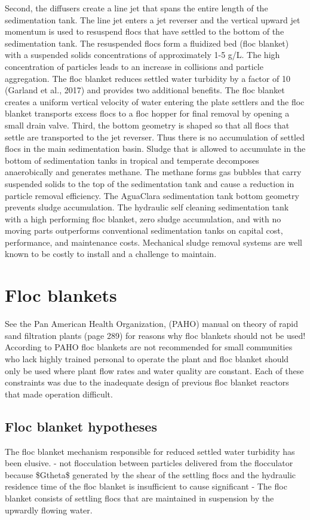 \documentclass[letterpaper,10pt,english]{sphinxmanual}
\begin{document}
Second, the diffusers create a line jet that spans the entire length of the sedimentation tank. The line jet enters a jet reverser and the vertical upward jet momentum is used to resuspend flocs that have settled to the bottom of the sedimentation tank. The resuspended flocs form a fluidized bed (floc blanket) with a suspended solids concentrations of approximately 1-5 g/L. The high concentration of particles leads to an increase in collisions and particle aggregation. The floc blanket reduces settled water turbidity by a factor of 10 (Garland et al., 2017) and provides two additional benefits. The floc blanket creates a uniform vertical velocity of water entering the plate settlers and the floc blanket transports excess flocs to a floc hopper for final removal by opening a small drain valve.
Third, the bottom geometry is shaped so that all flocs that settle are transported to the jet reverser. Thus there is no accumulation of settled flocs in the main sedimentation basin. Sludge that is allowed to accumulate in the bottom of sedimentation tanks in tropical and temperate decomposes anaerobically and generates methane. The methane forms gas bubbles that carry suspended solids to the top of the sedimentation tank and cause a reduction in particle removal efficiency.  The AguaClara sedimentation tank bottom geometry prevents sludge accumulation.
The hydraulic self cleaning sedimentation tank with a high performing floc blanket, zero sludge accumulation, and with no moving parts outperforms conventional sedimentation tanks on capital cost, performance, and maintenance costs. Mechanical sludge removal systems are well known to be costly to install and a challenge to maintain.


\section{Floc blankets}
\label{\detokenize{Sedimentation/Sed_Intro:floc-blankets}}\label{\detokenize{Sedimentation/Sed_Intro:id1}}
See the Pan American Health Organization, (PAHO) manual on theory of rapid sand filtration plants (page 289) for reasons why floc blankets should not be used! According to PAHO floc blankets are not recommended for small communities who lack highly trained personal to operate the plant and floc blanket should only be used where plant flow rates and water quality are constant. Each of these constraints was due to the inadequate design of previous floc blanket reactors that made operation difficult.


\subsection{Floc blanket hypotheses}
\label{\detokenize{Sedimentation/Sed_Intro:floc-blanket-hypotheses}}\label{\detokenize{Sedimentation/Sed_Intro:id2}}
The floc blanket mechanism responsible for reduced settled water turbidity has been elusive.
- not flocculation between particles delivered from the flocculator because \$Gtheta\$ generated by the shear of the settling flocs and the hydraulic residence time of the floc blanket is insufficient to cause significant
- The floc blanket consists of settling flocs that are maintained in suspension by the upwardly flowing water.
\end{document}
